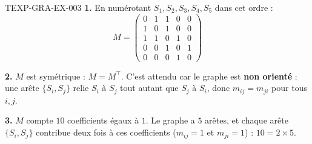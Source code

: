 \begin{corrige}{TEXP-GRA-EX-003}
\textbf{1.} En numérotant $S_1,S_2,S_3,S_4,S_5$ dans cet ordre :
$$M=\begin{pmatrix}0&1&1&0&0\\1&0&1&0&0\\1&1&0&1&0\\0&0&1&0&1\\0&0&0&1&0\end{pmatrix}$$

\textbf{2.} $M$ est symétrique : $M=M^{\top}$. C'est attendu car le graphe est \textbf{non orienté} : une arête $\{S_i,S_j\}$ relie $S_i$ à $S_j$ tout autant que $S_j$ à $S_i$, donc $m_{ij}=m_{ji}$ pour tous $i,j$.

\textbf{3.} $M$ compte $10$ coefficients égaux à $1$. Le graphe a $5$ arêtes, et chaque arête $\{S_i,S_j\}$ contribue deux fois à ces coefficients ($m_{ij}=1$ et $m_{ji}=1$) : $10=2\times5$.
\end{corrige}
